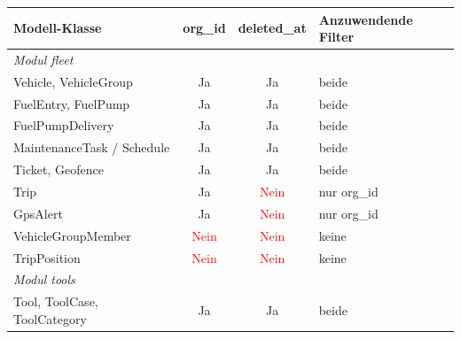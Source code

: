 \begin{table}[H]
    \begin{center}
        \renewcommand{\arraystretch}{1.3}
        \begin{tabular}{|l|c|c|l|}
            \hline
            \textbf{Modell-Klasse}        & \textbf{org\_id}               & \textbf{deleted\_at}           & \textbf{Anzuwendende Filter} \\
            \hline
            \multicolumn{4}{|l|}{\textit{Modul fleet}}                                                                                     \\
            \hline
            Vehicle, VehicleGroup         & \textcolor{green!60!black}{Ja} & \textcolor{green!60!black}{Ja} & beide                        \\
            FuelEntry, FuelPump           & \textcolor{green!60!black}{Ja} & \textcolor{green!60!black}{Ja} & beide                        \\
            FuelPumpDelivery              & \textcolor{green!60!black}{Ja} & \textcolor{green!60!black}{Ja} & beide                        \\
            MaintenanceTask / Schedule    & \textcolor{green!60!black}{Ja} & \textcolor{green!60!black}{Ja} & beide                        \\
            Ticket, Geofence              & \textcolor{green!60!black}{Ja} & \textcolor{green!60!black}{Ja} & beide                        \\
            Trip                          & \textcolor{green!60!black}{Ja} & \textcolor{red}{Nein}          & nur org\_id                  \\
            GpsAlert                      & \textcolor{green!60!black}{Ja} & \textcolor{red}{Nein}          & nur org\_id                  \\
            VehicleGroupMember            & \textcolor{red}{Nein}          & \textcolor{red}{Nein}          & keine                        \\
            TripPosition                  & \textcolor{red}{Nein}          & \textcolor{red}{Nein}          & keine                        \\
            \hline
            \multicolumn{4}{|l|}{\textit{Modul tools}}                                                                                     \\
            \hline
            Tool, ToolCase, ToolCategory  & \textcolor{green!60!black}{Ja} & \textcolor{green!60!black}{Ja} & beide                        \\

\end{tabular}
\end{center}
\end{table}
